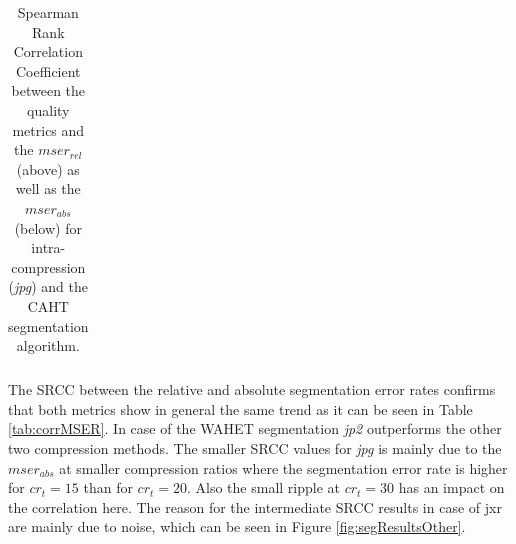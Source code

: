 \documentclass[10pt,twocolumn,letterpaper]{article}
\begin{document}
\begin{table}
\begin{tabular}{ | l || l | l | l | l | l | }
\end{tabular}
\caption{Spearman Rank Correlation Coefficient between the quality metrics and the $mser_{rel}$ (above) as well as the $mser_{abs}$ (below) for intra-compression (\emph{jpg}) and the CAHT segmentation algorithm.}
\label{tab:corrJPG}
\end{table}



The SRCC between the relative and absolute segmentation error rates confirms that both metrics show in general the same trend as it can be seen in Table \ref{tab:corrMSER}. In case of the WAHET segmentation \emph{jp2} outperforms the other two compression methods. The smaller SRCC values for \emph{jpg} is mainly due to the $mser_{abs}$ at smaller compression ratios where the segmentation error rate is higher for $cr_t = 15$ than for $cr_t = 20$. Also the small ripple at $cr_t = 30$ has an impact on the correlation here.
The reason for the intermediate SRCC results in case of jxr are mainly due to noise, which can be seen in Figure \ref{fig:segResultsOther}.
\end{document}
